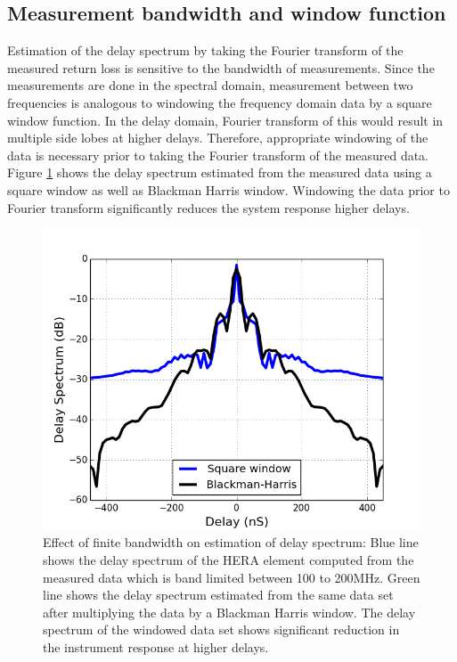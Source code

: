 \documentclass[twocolumn]{emulateapj}
\begin{document}
\subsection{Measurement bandwidth and window function}

Estimation of the delay spectrum by taking the Fourier transform of the
measured return loss is sensitive to the bandwidth of measurements. Since the
measurements are done in the spectral domain, measurement between two
frequencies is analogous to windowing the frequency domain data by a square
window function. In the delay domain, Fourier transform of this would result in
multiple side lobes at higher delays. Therefore, appropriate windowing of the
data is  necessary prior to taking the Fourier transform of the measured data.
Figure \ref{fig:window} shows the delay spectrum estimated from the measured
data using a square window as well as Blackman Harris window. Windowing the
data prior to Fourier transform significantly reduces the system response
higher delays.  

\begin{figure}
\centering
\includegraphics[width=\linewidth]{GB_reflectometry_part3/plot/ds_window.png}
\caption{Effect of finite bandwidth on estimation of delay spectrum: Blue line shows the delay spectrum of the HERA element computed from the measured data which is band limited between 100 to 200MHz. Green line shows the delay spectrum estimated from the same data set after multiplying the data by a Blackman Harris window. The delay spectrum of the windowed data set shows significant reduction in the instrument response at higher delays.}
\label{fig:window}
\end{figure} 
\end{document}
